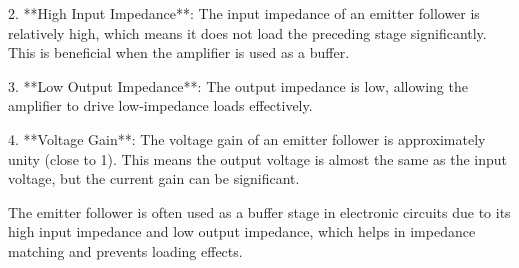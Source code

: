 2. **High Input Impedance**: The input impedance of an emitter follower is relatively high, which means it does not load the preceding stage significantly. This is beneficial when the amplifier is used as a buffer.

3. **Low Output Impedance**: The output impedance is low, allowing the amplifier to drive low-impedance loads effectively.

4. **Voltage Gain**: The voltage gain of an emitter follower is approximately unity (close to 1). This means the output voltage is almost the same as the input voltage, but the current gain can be significant.

The emitter follower is often used as a buffer stage in electronic circuits due to its high input impedance and low output impedance, which helps in impedance matching and prevents loading effects.

